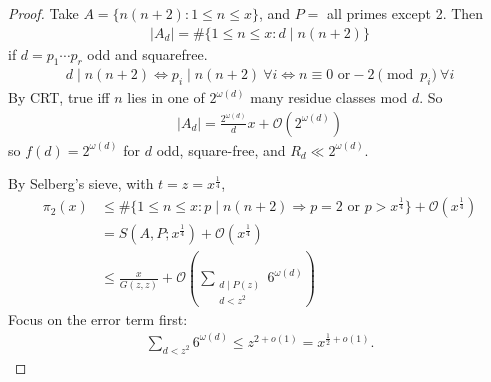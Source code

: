 \documentclass{article}
\newcommand{\bigO}{\mathcal{O}}
\begin{document}
\begin{proof}
  Take $A = \{n(n+2) : 1 \leq n \leq x\}$, and $P=$ all primes except 2.
  Then
  \begin{align*}
    |A_d| = \#\{1 \leq n \leq x : d \mid n(n+2)\}
  \end{align*}
  if $d = p_1 \dotsm p_r$ odd and squarefree.
  \begin{align*}
    d \mid n(n+2) \iff p_i \mid n(n+2) \ \forall i \iff n \equiv 0 \text{ or} -2 \pmod{p_i} \ \forall i
  \end{align*}
  By CRT, true iff $n$ lies in one of $2^{\omega(d)}$ many residue classes mod $d$. So
  \begin{align*}
    |A_d| = \frac{2^{\omega(d)}}{d} x + \bigO(2^{\omega(d)})
  \end{align*}
  so $f(d) = 2^{\omega(d)}$ for $d$ odd, square-free, and $R_d \ll 2^{\omega(d)}$.

  By Selberg's sieve, with $t = z = x^{\frac{1}{4}}$,
  \begin{align*}
    \pi_2(x) &\leq \# \{1 \leq n \leq x : p \mid n(n+2) \Rightarrow p = 2 \text{ or } p > x^{\frac 14}\} + \bigO(x^{\frac{1}4}) \\
             &= S(A,P; x^{\frac{1}{4}}) + \bigO(x^{\frac 14}) \\
             &\leq \frac{x}{G(z,z)} + \bigO(\sum_{\substack{d \mid P(z) \\ d < z^2}} 6^{\omega(d)})
  \end{align*}
  Focus on the error term first:
  \begin{align*}
    \sum_{d < z^2} 6^{\omega(d)} \leq z^{2 + o(1)} = x^{\frac{1}{2} + o(1)}.
  \end{align*}


\end{proof}
\end{document}

